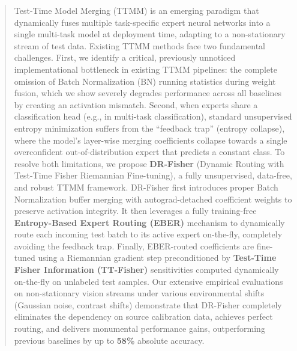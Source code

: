 \documentclass{article}
\theoremstyle{plain}
\theoremstyle{definition}
\theoremstyle{remark}
\begin{document}

\printAffiliationsAndNotice{}

\begin{abstract}
Test-Time Model Merging (TTMM) is an emerging paradigm that dynamically fuses multiple task-specific expert neural networks into a single multi-task model at deployment time, adapting to a non-stationary stream of test data. Existing TTMM methods face two fundamental challenges. First, we identify a critical, previously unnoticed implementational bottleneck in existing TTMM pipelines: the complete omission of Batch Normalization (BN) running statistics during weight fusion, which we show severely degrades performance across all baselines by creating an activation mismatch. Second, when experts share a classification head (e.g., in multi-task classification), standard unsupervised entropy minimization suffers from the ``feedback trap'' (entropy collapse), where the model's layer-wise merging coefficients collapse towards a single overconfident out-of-distribution expert that predicts a constant class. To resolve both limitations, we propose \textbf{DR-Fisher} (Dynamic Routing with Test-Time Fisher Riemannian Fine-tuning), a fully unsupervised, data-free, and robust TTMM framework. DR-Fisher first introduces proper Batch Normalization buffer merging with autograd-detached coefficient weights to preserve activation integrity. It then leverages a fully training-free \textbf{Entropy-Based Expert Routing (EBER)} mechanism to dynamically route each incoming test batch to its active expert on-the-fly, completely avoiding the feedback trap. Finally, EBER-routed coefficients are fine-tuned using a Riemannian gradient step preconditioned by \textbf{Test-Time Fisher Information (TT-Fisher)} sensitivities computed dynamically on-the-fly on unlabeled test samples. Our extensive empirical evaluations on non-stationary vision streams under various environmental shifts (Gaussian noise, contrast shifts) demonstrate that DR-Fisher completely eliminates the dependency on source calibration data, achieves perfect routing, and delivers monumental performance gains, outperforming previous baselines by up to \textbf{58\%} absolute accuracy.
\end{abstract}
\end{document}
